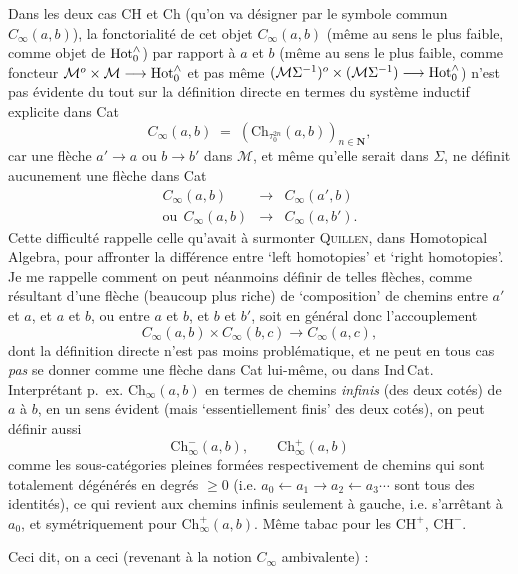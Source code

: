 Dans les deux cas CH et Ch (qu'on va désigner par le symbole commun $C_{\infty}(a,b)$), la fonctorialité de cet objet $C_{\infty}(a,b)$ (même au sens le plus faible, comme objet de $\mathrm{Hot}_0^{\wedge}$) par rapport à $a$ et $b$ (même au sens le plus faible, comme foncteur $\mathcal{M}^o\times\mathcal{M}\longrightarrow\mathrm{Hot}_0^{\wedge}$ et pas même $(\mathcal{M}\Sigma^{-1})^o\times(\mathcal{M}\Sigma^{-1})\longrightarrow\mathrm{Hot}_0^{\wedge}$) n'est pas évidente du tout sur la définition directe en termes du système inductif explicite dans Cat
\[
C_{\infty}(a,b) \;=\; (\mathrm{Ch}_{\tau_0^{2n}}(a,b))_{n\in\mathbf{N}},
\]
car une flèche $a'\longrightarrow a$ ou $b\longrightarrow b'$ dans $\mathcal{M}$, et même qu'elle serait dans $\Sigma$, ne définit aucunement une flèche dans Cat
\[
\begin{array}{rcl}
C_{\infty}(a,b) & \longrightarrow & C_{\infty}(a',b)\\
\text{ou}\ \ C_{\infty}(a,b) & \longrightarrow & C_{\infty}(a,b').
\end{array}
\]
Cette difficulté rappelle celle qu'avait à surmonter \textsc{Quillen}, dans Homotopical Algebra, pour affronter la différence entre `left homotopies' et `right homotopies'. Je me rappelle comment
on peut néanmoins définir de telles flèches, comme résultant d'une flèche (beaucoup plus riche) de `composition' de chemins entre $a'$ et $a$, et $a$ et $b$, ou entre $a$ et $b$, et $b$ et $b'$, soit en général donc l'accouplement
\[
C_{\infty}(a,b)\times C_{\infty}(b,c)\longrightarrow C_{\infty}(a,c),
\]
dont la définition directe n'est pas moins problématique, et ne peut en tous cas \textit{pas} se donner comme une flèche dans Cat lui-même, ou dans Ind\,Cat. Interprétant p.~ex. $\mathrm{Ch}_{\infty}(a,b)$ en termes de chemins \textit{infinis} (des deux cotés) de $a$ à $b$, en un sens évident (mais %
`essentiellement finis' des deux cotés), on peut définir aussi %
\[
\mathrm{Ch}^{-}_{\infty}(a,b), \qquad \mathrm{Ch}^{+}_{\infty}(a,b)
\]
comme les sous-catégories pleines formées respectivement de chemins qui sont totalement dégénérés en degrés $\geq 0$ (i.e. $a_0\longleftarrow a_1\longrightarrow a_2\longleftarrow a_3\cdots$ sont tous des identités), ce qui revient aux chemins infinis seulement à gauche, i.e. s'arrêtant à $a_0$, et symétriquement pour $\mathrm{Ch}^{+}_{\infty}(a,b)$. Même tabac pour les $\mathrm{CH}^{+}$, $\mathrm{CH}^{-}$.

Ceci dit, on a ceci (revenant à la notion $C_{\infty}$ ambivalente) :

